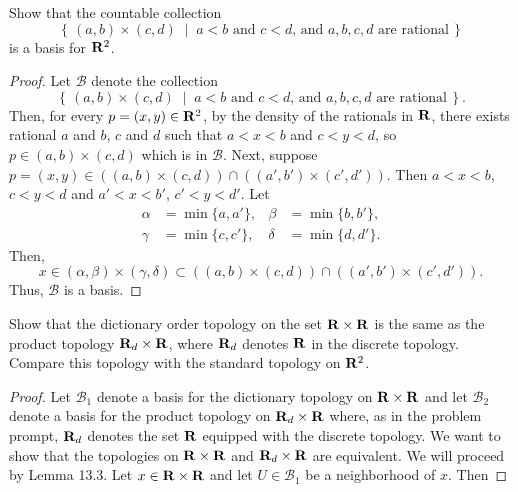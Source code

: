 \begin{problem}[Munkres, \S16, 6.]
Show that the countable collection
\[
\left\{\,(a,b)\times(c,d)\;\middle|\;
\text{$a<b$ and $c<d$, and $a,b,c,d$ are rational}\,\right\}
\]
is a basis for $\mathbf{R}^2$.
\end{problem}
\begin{proof}
Let $\mathcal{B}$ denote the collection
\[
\left\{\,(a,b)\times(c,d)\;\middle|\;
\text{$a<b$ and $c<d$, and $a,b,c,d$ are rational}\,\right\}.
\]
Then, for every $p=(x,y)\in\mathbf{R}^2$, by the density of the
rationals in $\mathbf{R}$, there exists rational $a$ and $b$, $c$ and
$d$ such that $a<x<b$ and $c<y<d$, so $p\in (a,b)\times (c,d)$
which is in $\mathcal{B}$. Next, suppose $p=(x,y)\in
\left((a,b)\times(c,d)\right) \cap \left((a',b')\times
  (c',d')\right)$. Then $a<x<b$, $c<y<d$ and $a'<x<b'$,
$c'<y<d'$. Let
\begin{align*}
\alpha&=\min\{a,a'\},&\beta&=\min\{b,b'\},\\
\gamma&=\min\{c,c'\},&\delta&=\min\{d,d'\}.
\end{align*}
Then,
\[
x\in(\alpha,\beta)\times(\gamma,\delta)\subset\left((a,b)\times(c,d)\right)\cap\left((a',b')\times(c',d')\right).
\]
Thus, $\mathcal{B}$ is a basis.
\end{proof}
\newpage

\begin{problem}[Munkres, \S16, 9.]
Show that the dictionary order topology on the set $\mathbf{R}\times\mathbf{R}$
is the same as the product topology $\mathbf{R}_d\times\mathbf{R}$, where
$\mathbf{R}_d$ denotes $\mathbf{R}$ in the discrete topology. Compare this
topology with the standard topology on $\mathbf{R}^2$.
\end{problem}
\begin{proof}
Let $\mathcal{B}_1$ denote a basis for the dictionary topology on
$\mathbf{R}\times\mathbf{R}$ and let $\mathcal{B}_2$ denote a basis for the
product topology on $\mathbf{R}_d\times\mathbf{R}$ where, as in the problem
prompt, $\mathbf{R}_d$ denotes the set $\mathbf{R}$ equipped with the discrete
topology. We want to show that the topologies on $\mathbf{R}\times\mathbf{R}$
and $\mathbf{R}_d\times\mathbf{R}$ are equivalent. We will proceed by Lemma
13.3. Let $x\in\mathbf{R}\times\mathbf{R}$ and let $U\in\mathcal{B}_1$ be a
neighborhood of $x$. Then
\end{proof}

